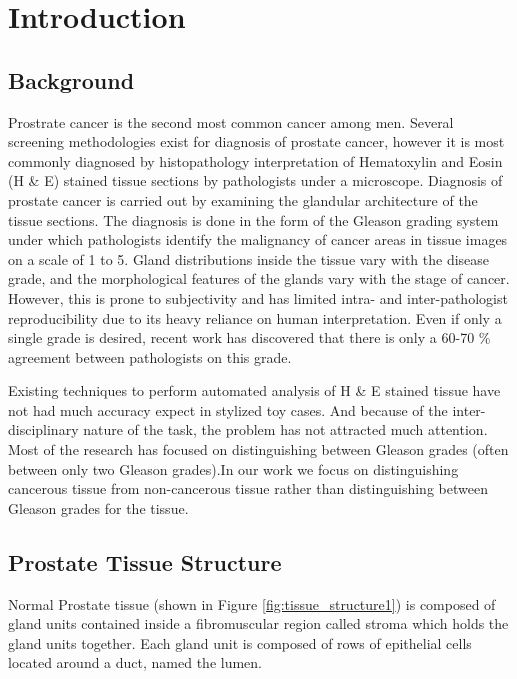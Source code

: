 \section{Introduction}
\label{sec:introduction}

\subsection{Background}
Prostrate cancer is the second most common cancer
among men. Several screening methodologies exist for diagnosis of prostate cancer, however it is most commonly diagnosed by histopathology interpretation of Hematoxylin and Eosin (H \& E) stained tissue sections by pathologists under a microscope. Diagnosis of prostate cancer is carried out by examining the glandular architecture of the tissue sections. The diagnosis is done in the form of the Gleason grading system \cite{gleason1966classification} under which pathologists identify the malignancy of cancer areas in tissue images on a scale of 1 to 5. Gland distributions inside the tissue vary with the disease grade, and the morphological features of the glands vary with the stage of cancer. However, this is prone to subjectivity and has limited intra- and inter-pathologist reproducibility due to its heavy reliance on human interpretation. Even if only a single grade is desired, recent work has discovered that there is only a 60-70 \% agreement between pathologists on this grade.


Existing techniques to perform automated analysis of H \& E stained tissue have not had much accuracy expect in stylized toy cases. And because of the inter-disciplinary nature of the task, the problem has not attracted much attention. Most of the research has focused on distinguishing between Gleason grades (often between only two Gleason grades).In our work we focus on distinguishing cancerous tissue from non-cancerous tissue rather than distinguishing between Gleason grades for the tissue.

\subsection{Prostate Tissue Structure}
Normal Prostate tissue (shown in Figure \ref{fig:tissue_structure1}) is composed of gland units contained inside a fibromuscular region called stroma which holds the gland units together. Each gland unit is composed of rows of epithelial cells located around a duct, named the lumen. 

